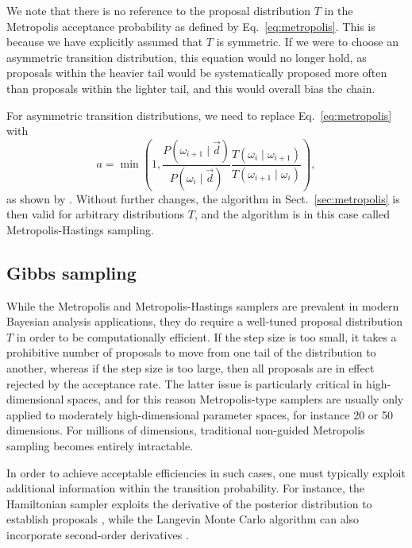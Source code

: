 \documentclass[onecolumn]{aa}
\renewcommand{\d}[0]{\vec{d}}
\begin{document}
We note that there is no reference to the proposal distribution $T$ in
the Metropolis acceptance probability as defined by
Eq.~\eqref{eq:metropolis}. This is because we have explicitly assumed
that $T$ is symmetric. If we were to choose an asymmetric transition
distribution, this equation would no longer hold, as proposals within
the heavier tail would be systematically proposed more often than
proposals within the lighter tail, and this would overall bias the
chain. 

For asymmetric transition distributions, we need to replace
Eq.~\eqref{eq:metropolis} with
\begin{equation}
  a = \min\left(1,
  \frac{P(\omega_{i+1}\mid \d)}{P(\omega_i\mid \d)}\frac{T(\omega_{i}\mid
    \omega_{i+1})}{T(\omega_{i+1}\mid \omega_i)}\right),
  \label{eq:metropolis-hastings}  
\end{equation}
as shown by \citet{hastings:1970}.  Without further changes, the
algorithm in Sect.~\ref{sec:metropolis} is then valid for arbitrary
distributions $T$, and the algorithm is in this case called
Metropolis-Hastings sampling.

\subsection{Gibbs sampling}
\label{sec:gibbs}

While the Metropolis and Metropolis-Hastings samplers are prevalent in
modern Bayesian analysis applications, they do require a well-tuned
proposal distribution $T$ in order to be computationally efficient. If
the step size is too small, it takes a prohibitive number of proposals
to move from one tail of the distribution to another, whereas if the
step size is too large, then all proposals are in effect rejected by
the acceptance rate. The latter issue is particularly critical in
high-dimensional spaces, and for this reason Metropolis-type samplers
are usually only applied to moderately high-dimensional parameter
spaces, for instance 20 or 50 dimensions. For millions of dimensions,
traditional non-guided Metropolis sampling becomes entirely intractable.

In order to achieve acceptable efficiencies in such cases, one must
typically exploit additional information within the transition
probability. For instance, the Hamiltonian sampler exploits the
derivative of the posterior distribution to establish proposals
\citep[e.g,][]{liu:2008}, while the Langevin Monte Carlo algorithm can
also incorporate second-order derivatives \citep{girolami:2011}.
\end{document}
